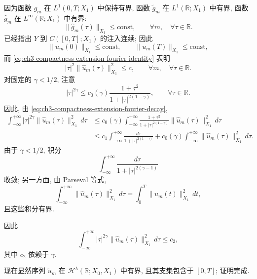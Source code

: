 \begin{Proof}
因为函数 $g_m$ 在 $L^1(0,T;X_1)$ 中保持有界, 函数 $\widetilde g_m$ 在 $L^1(\mathbb R;X_1)$ 中有界, 函数 $\widehat g_m$ 在 $L^\infty(\mathbb R;X_1)$ 中有界:
\begin{equation}
\lVert\widehat g_m(\tau)\rVert_{X_1}\leq\mathrm{const},
\qquad\forall m,\quad\forall\tau\in\mathbb R.
\label{eq:ch3-compactness-extension-g-fourier-bound}
\end{equation}
已经指出 $Y$ 到 $C([0,T];X_1)$ 的注入连续; 因此
\[
\lVert u_m(0)\rVert_{X_1}\leq\mathrm{const},
\qquad
\lVert u_m(T)\rVert_{X_1}\leq\mathrm{const},
\]
而 \eqref{eq:ch3-compactness-extension-fourier-identity} 表明
\begin{equation}
|\tau|^2\lVert\widehat u_m(\tau)\rVert_{X_1}^2\leq c,
\qquad\forall m,\quad\forall\tau\in\mathbb R.
\label{eq:ch3-compactness-extension-fourier-decay}
\end{equation}
对固定的 $\gamma<1/2$, 注意
\[
|\tau|^{2\gamma}\leq c_0(\gamma)
\frac{1+\tau^2}{1+|\tau|^{2(1-\gamma)}},
\qquad\forall\tau\in\mathbb R.
\]
因此, 由 \eqref{eq:ch3-compactness-extension-fourier-decay},
\[
\begin{aligned}
\int_{-\infty}^{+\infty}|\tau|^{2\gamma}
\lVert\widehat u_m(\tau)\rVert_{X_1}^2\,d\tau
&\leq c_0(\gamma)\int_{-\infty}^{+\infty}
\frac{1+\tau^2}{1+|\tau|^{2(1-\gamma)}}
\lVert\widehat u_m(\tau)\rVert_{X_1}^2\,d\tau\\
&\leq c_1\int_{-\infty}^{+\infty}
\frac{d\tau}{1+|\tau|^{2(1-\gamma)}}
+c_0(\gamma)\int_{-\infty}^{+\infty}
\lVert\widehat u_m(\tau)\rVert_{X_1}^2\,d\tau.
\end{aligned}
\]
由于 $\gamma<1/2$, 积分
\[
\int_{-\infty}^{+\infty}\frac{d\tau}{1+|\tau|^{2(\gamma-1)}}
\]
收敛; 另一方面, 由 Parseval 等式,
\[
\int_{-\infty}^{+\infty}\lVert\widehat u_m(\tau)\rVert_{X_1}^2\,d\tau
=\int_0^T\lVert u_m(t)\rVert_{X_1}^2\,dt,
\]
且这些积分有界.

因此
\begin{equation}
\int_{-\infty}^{+\infty}|\tau|^{2\gamma}
\lVert\widehat u_m(\tau)\rVert_{X_1}^2\,d\tau\leq c_2,
\label{eq:ch3-compactness-extension-fractional-bound}
\end{equation}
其中 $c_2$ 依赖于 $\gamma$.

现在显然序列 $\widetilde u_m$ 在 $\mathcal H^\lambda(\mathbb R;X_0,X_1)$ 中有界, 且其支集包含于 $[0,T]$; 证明完成.
\end{Proof}
